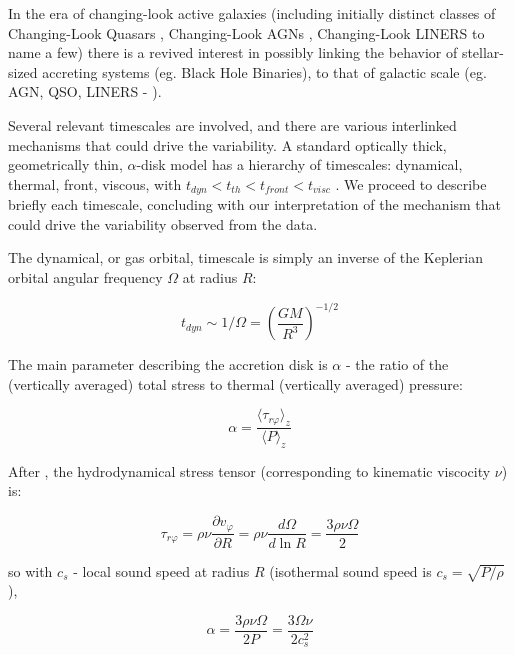 \documentclass[twocolumn]{aastex62}
\begin{document}
In the era of changing-look active galaxies (including initially distinct classes of Changing-Look Quasars \citep{lamassa2015, macleod2019}, Changing-Look AGNs \citep{marchese2012, bianchi2009,risaliti2009}, Changing-Look LINERS \citep{frederick2019} to name a few) there is a revived interest in possibly linking the behavior of stellar-sized accreting systems (eg. Black Hole Binaries),  to that of galactic scale (eg. AGN, QSO, LINERS  - \citealt{noda2018, ruan2019}). 

Several relevant timescales are involved, and there are various interlinked mechanisms that could drive the variability. A standard optically thick, geometrically thin, $\alpha$-disk model has a hierarchy of timescales: dynamical, thermal, front, viscous, with   $t_{dyn} < t_{th} < t_{front}  < t_{visc} $ \citep{netzer2013, frank2002}. We proceed to describe briefly each timescale, concluding with our interpretation of the mechanism that could drive the variability observed from the data. 

The dynamical, or gas orbital, timescale is simply  an inverse of the Keplerian orbital angular frequency $ \Omega$  at radius $R$: 

\begin{equation}
t_{dyn} {\sim}  1 / \Omega = \left( \frac{GM}{R^{3}}\right)^{-1/2}
\end{equation}


The main parameter  describing the accretion disk is $\alpha$ - the ratio of the (vertically averaged) total stress to thermal (vertically averaged) pressure: 

\begin{equation}
\alpha= \frac{\langle \tau_{r\varphi}  \rangle_{z} }{\langle P \rangle _{z}} 
\end{equation}


After \cite{lasota2016},  the hydrodynamical stress tensor (corresponding to  kinematic viscocity $\nu$) is:

\begin{equation}
\tau_{r\varphi } = \rho \nu \frac{\partial v_{\varphi}}{\partial R} = \rho \nu \frac{d \Omega}{d \ln{R}} = \frac{3 \rho \nu \Omega}{2}  
\end{equation}

so  with  $c_{s}$ -  local sound speed at radius $R$ (isothermal sound speed is $c_{s} = \sqrt{P/\rho}$),

\begin{equation}
\alpha  =   \frac{3 \rho \nu \Omega}{2 P} =  \frac{3 \Omega \nu}{2 c_{s}^{2}}
\end{equation}
\end{document}
